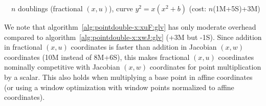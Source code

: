 \documentclass{llncs}
\begin{document}
\begin{algorithm}[H]
    \caption{\ \ $n$ doublings (fractional $(x,u)$), curve $y^2 = x(x^2+b)$ (cost: $n$(1M+5S)+3M)}\label{alg:pointdouble-x:xuF:glv}
    \begin{algorithmic}[1]
        \EndFor
    \end{algorithmic}
\end{algorithm}

We note that algorithm~\ref{alg:pointdouble-x:xuF:glv} has only moderate
overhead compared to algorithm~\ref{alg:pointdouble-x:xwJ:glv} (+3M but
-1S). Since addition in fractional $(x,u)$ coordinates is faster than
addition in Jacobian $(x,w)$ coordinates (10M instead of 8M+6S), this
makes fractional $(x,u)$ coordinates nominally competitive with Jacobian
$(x,w)$ coordinates for point multiplication by a scalar. This also
holds when multiplying a base point in affine coordinates (or using a
window optimization with window points normalized to affine
coordinates).
\end{document}
